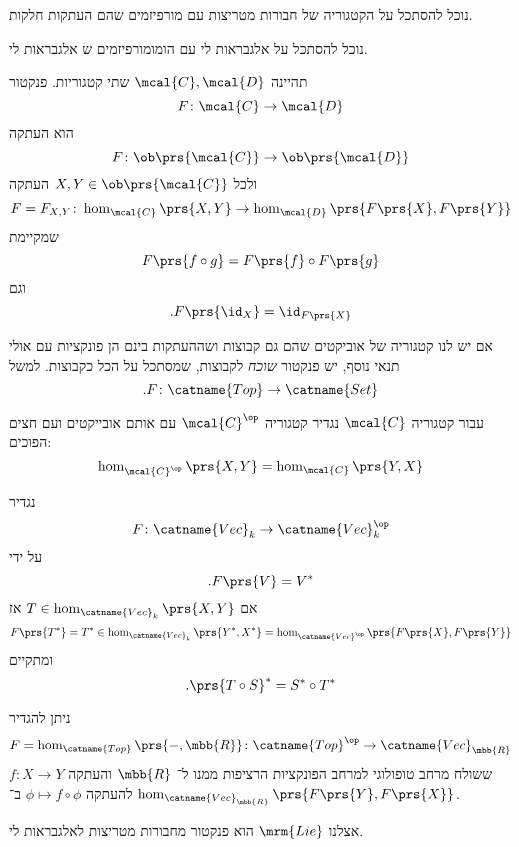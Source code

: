 \documentclass[10pt, twoside]{book}
\newcommand{\Lie}{\mrm{Lie}}
\begin{document}
\begin{example}
נוכל להסתכל על הקטגוריה של חבורות מטריצות עם מורפיזמים שהם העתקות חלקות.

נוכל להסתכל על אלגבראות לי עם הומומורפיזמים ש אלגבראות לי.
\end{example}


\begin{definition}[פנקטור]
תהיינה
$\mcal{C}, \mcal{D}$
שתי קטגוריות.
פנקטור
\[F \colon \mcal{C} \to \mcal{D}\]
הוא העתקה
\[F \colon \ob\prs{\mcal{C}} \to \ob\prs{\mcal{D}}\]
ולכל
$X,Y \in \ob\prs{\mcal{C}}$
העתקה
\[F = F_{X,Y} \colon \hom_{\mcal{C}}\prs{X,Y} \to \hom_{\mcal{D}}\prs{F\prs{X}, F\prs{Y}}\]
שמקיימת
\[F \prs{f \circ g} = F\prs{f} \circ F\prs{g}\]
וגם
\[\text{.} F\prs{\id_X} = \id_{F\prs{X}}\]
\end{definition}

\begin{example}
אם יש לנו קטגוריה של אוביקטים שהם גם קבוצות ושההעתקות בינם הן פונקציות עם אולי תנאי נוסף, יש פנקטור
\emph{שוכח}
לקבוצות, שמסתכל על הכל כקבוצות. למשל
\[\text{.} F \colon \catname{Top} \to \catname{Set}\]
\end{example}

\begin{definition}
עבור קטגוריה
$\mcal{C}$
נגדיר קטגוריה
$\mcal{C}^\op$
עם אותם אובייקטים ועם חצים הפוכים:
\[\hom_{\mcal{C}^\op}\prs{X,Y} = \hom_{\mcal{C}}\prs{Y,X}\]
\end{definition}

\begin{example}
נגדיר
\[F \colon \catname{Vec}_k \to \catname{Vec}_k^\op\]
על ידי
\[\text{.} F\prs{V} = V^*\]
אם
$T \in \hom_{\catname{Vec}_k}\prs{X,Y}$
אז
\[F\prs{T^*} = T^* \in \hom_{\catname{Vec}_k} \prs{Y^*, X^*} = \hom_{\catname{Vec}^\op} \prs{F\prs{X}, F\prs{Y}}\]
ומתקיים
\[\text{.} \prs{T \circ S}^* = S^* \circ T^*\]
\end{example}

\begin{example}
ניתן להגדיר
\[F = \hom_{\catname{Top}}\prs{-, \mbb{R}} \colon \catname{Top}^\op \to \catname{Vec}_{\mbb{R}}\]
ששולח מרחב טופולוגי למרחב הפונקציות הרציפות ממנו ל־%
$\mbb{R}$
והעתקה
$f \colon X \to Y$
להעתקה
$\phi \mapsto f \circ \phi$
ב־%
$\hom_{\catname{Vec}_{\mbb{R}}}\prs{F\prs{Y}, F\prs{X}}$.
\end{example}

\begin{example}
אצלנו
$\Lie$
הוא פנקטור מחבורות מטריצות לאלגבראות לי.
\end{example}
\end{document}

